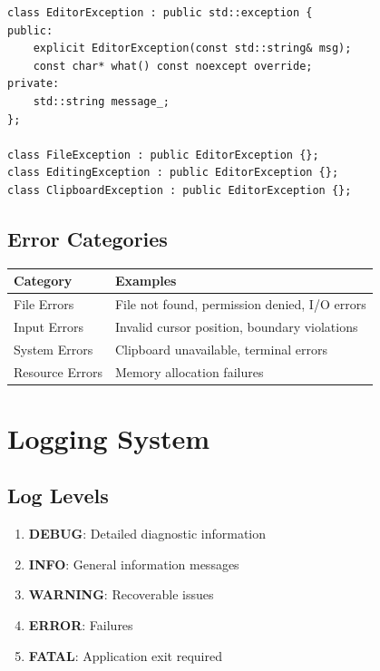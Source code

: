 \documentclass[12pt,a4paper,oneside,openany]{report}
\begin{document}
\begin{lstlisting}
class EditorException : public std::exception {
public:
    explicit EditorException(const std::string& msg);
    const char* what() const noexcept override;
private:
    std::string message_;
};

class FileException : public EditorException {};
class EditingException : public EditorException {};
class ClipboardException : public EditorException {};
\end{lstlisting}

\subsection{Error Categories}

\begin{table}[H]
	\centering
	\begin{tabular}{|l|p{6cm}|}
		\hline
		\textbf{Category} & \textbf{Examples}                             \\
		\hline
		File Errors       & File not found, permission denied, I/O errors \\
		\hline
		Input Errors      & Invalid cursor position, boundary violations  \\
		\hline
		System Errors     & Clipboard unavailable, terminal errors        \\
		\hline
		Resource Errors   & Memory allocation failures                    \\
		\hline
	\end{tabular}
\end{table}

\newpage
\section{Logging System}

\subsection{Log Levels}

\begin{enumerate}
	\item \textbf{DEBUG}: Detailed diagnostic information
	\item \textbf{INFO}: General information messages
	\item \textbf{WARNING}: Recoverable issues
	\item \textbf{ERROR}: Failures
	\item \textbf{FATAL}: Application exit required
\end{enumerate}
\end{document}
